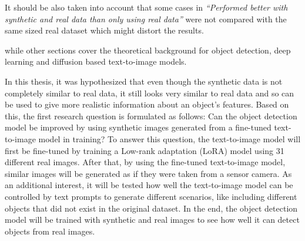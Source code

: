 







It should be also taken into account that some cases in \textit{“Performed better with synthetic and real data than only using real data”} were not compared with the same sized real dataset which might distort the results.

while other sections cover the theoretical background for object detection, deep learning and diffusion based text-to-image models.

In this thesis, it was hypothesized that even though the synthetic data is not completely similar to real data, it still looks very similar to real data and so can be used to give more realistic information about an object's features. Based on this, the first research question is formulated as follows: Can the object detection model be improved by using synthetic images generated from a fine-tuned text-to-image model in training? To answer this question, the text-to-image model will first be fine-tuned by training a Low-rank adaptation (LoRA) model using 31 different real images. After that, by using the fine-tuned text-to-image model, similar images will be generated as if they were taken from a sensor camera. As an additional interest, it will be tested how well the text-to-image model can be controlled by text prompts to generate different scenarios, like including different objects that did not exist in the original dataset. In the end, the object detection model will be trained with synthetic and real images to see how well it can detect objects from real images.

